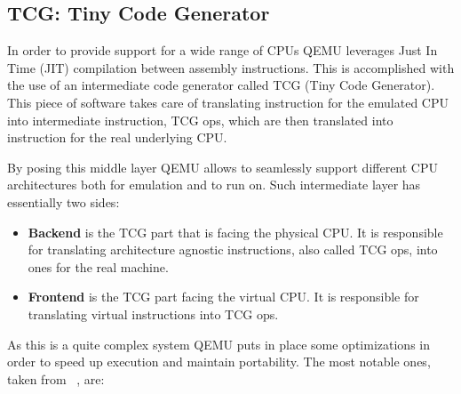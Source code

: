 \subsection{TCG: Tiny Code Generator}

In order to provide support for a wide range of CPUs QEMU leverages Just In Time (JIT) compilation between assembly instructions. This is accomplished with the use of an intermediate code generator called TCG (Tiny Code Generator). This piece of software takes care of translating instruction for the emulated CPU into intermediate instruction, TCG ops, which are then translated into instruction for the real underlying CPU.

By posing this middle layer QEMU allows to seamlessly support different CPU architectures both for emulation and to run on. Such intermediate layer has essentially two sides:

\begin{itemize}
    \item \textbf{Backend} is the TCG part that is facing the physical CPU. It is responsible for translating architecture agnostic instructions, also called TCG ops, into ones for the real machine.
    \item \textbf{Frontend} is the TCG part facing the virtual CPU. It is responsible for translating virtual instructions into TCG ops.
\end{itemize} 

As this is a quite complex system QEMU puts in place some optimizations in order to speed up execution and maintain portability. The most notable ones, taken from ~\cite{translatorinternals}, are:

